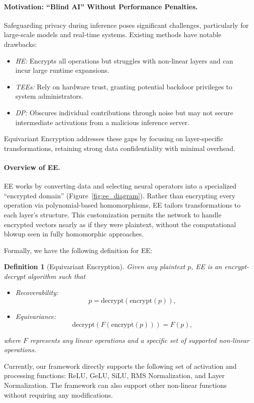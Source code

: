 \documentclass[10pt]{article}
\newtheorem{definition}{Definition}
\begin{document}
\paragraph{Motivation: ``Blind AI'' Without Performance Penalties.}
Safeguarding privacy during inference poses significant challenges, particularly for large-scale models and real-time systems. Existing methods have notable drawbacks:
\begin{itemize}
    \item \textit{HE:} Encrypts all operations but struggles with non-linear layers and can incur large runtime expansions.
    \item \textit{TEEs:} Rely on hardware trust, granting potential backdoor privileges to system administrators.
    \item \textit{DP:} Obscures individual contributions through noise but may not secure intermediate activations from a malicious inference server.
\end{itemize}
Equivariant Encryption addresses these gaps by focusing on layer-specific transformations, retaining strong data confidentiality with minimal overhead.

\paragraph{Overview of EE.}
EE works by converting data and selecting neural operators into a specialized “encrypted domain” (Figure~\ref{fig:ee_diagram}).
Rather than encrypting every operation via polynomial-based homomorphisms, EE tailors transformations to each layer’s structure. This customization permits the network to handle encrypted vectors nearly as if they were plaintext, without the computational blowup seen in fully homomorphic approaches.

Formally, we have the following definition for EE:
\begin{definition}[Equivariant Encryption]
Given any plaintext $p$, EE is an encrypt-decrypt algorithm such that
\begin{itemize}
\item
Recoverability:
\begin{equation}
p=\mathrm{decrypt}(\mathrm{encrypt}(p)),
\end{equation}
\item
Equivariance:
\begin{equation}
\mathrm{decrypt}(F(\mathrm{encrypt}(p))) = F(p),
\end{equation}
\end{itemize}
where $F$ represents any linear operations and a specific set of supported non-linear operations.
\end{definition}
Currently, our framework directly supports the following set of activation and processing functions: ReLU, GeLU, SiLU, RMS Normalization, and Layer Normalization. The framework can also support other non-linear functions without requiring any modifications. 
\end{document}
